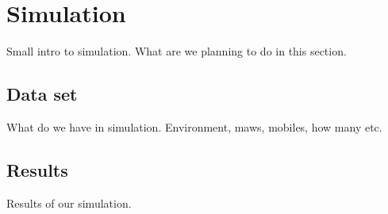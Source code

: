 \documentclass[conference]{IEEEtran}
\begin{document}





\section{Simulation}
Small intro to simulation. What are we planning to do in this section.









\subsection{Data set}
What do we have in simulation. Environment, maws, mobiles, how many etc.









\subsection{Results}
Results of our simulation.







\end{document}
